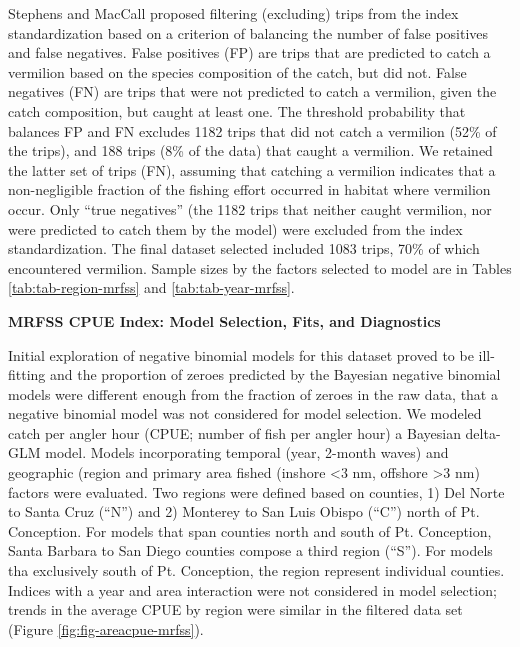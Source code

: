 \documentclass[
  english,
  a4paper,
]{article}
\begin{document}
Stephens and MacCall proposed filtering (excluding) trips from the index
standardization based on a criterion of balancing the number of false positives
and false negatives. False positives (FP) are trips that are predicted to catch
a vermilion based on the species composition of the catch, but did not. False
negatives (FN) are trips that were not predicted to catch a vermilion, given the
catch composition, but caught at least one. The threshold probability that
balances FP and FN excludes
1182
trips that did not catch a vermilion (52\%
of the trips), and 188
trips (8\% of the data) that
caught a vermilion. We retained the latter set of trips (FN), assuming that
catching a vermilion indicates that a non-negligible fraction of the fishing
effort occurred in habitat where vermilion occur. Only ``true negatives''
(the 1182
trips that neither caught vermilion, nor were predicted to catch them by the model)
were excluded from the index standardization. The final dataset selected included
1083 trips, 70\%
of which encountered vermilion. Sample sizes by the factors selected to model are in Tables
\ref{tab:tab-region-mrfss} and \ref{tab:tab-year-mrfss}.

\textbf{MRFSS CPUE Index: Model Selection, Fits, and Diagnostics}

Initial exploration of negative binomial models for this dataset proved to be
ill-fitting and the proportion of zeroes predicted by the Bayesian negative binomial
models were different enough from the fraction of zeroes in the raw data, that
a negative binomial model was not considered for model selection. We modeled catch
per angler hour (CPUE; number of fish per angler hour) a Bayesian delta-GLM model.
Models incorporating temporal (year, 2-month waves)
and geographic (region and primary area fished (inshore \textless3 nm, offshore \textgreater3 nm)
factors were evaluated. Two regions were defined based on counties, 1) Del Norte
to Santa Cruz (``N'') and 2) Monterey to San Luis Obispo (``C'') north of Pt. Conception.
For models that span counties north and south of Pt. Conception, Santa Barbara to
San Diego counties compose a third region (``S''). For models tha exclusively south
of Pt. Conception, the region represent individual counties. Indices with a year
and area interaction were not considered in model selection; trends in the average
CPUE by region were similar in the filtered data set (Figure \ref{fig:fig-areacpue-mrfss}).
\end{document}
